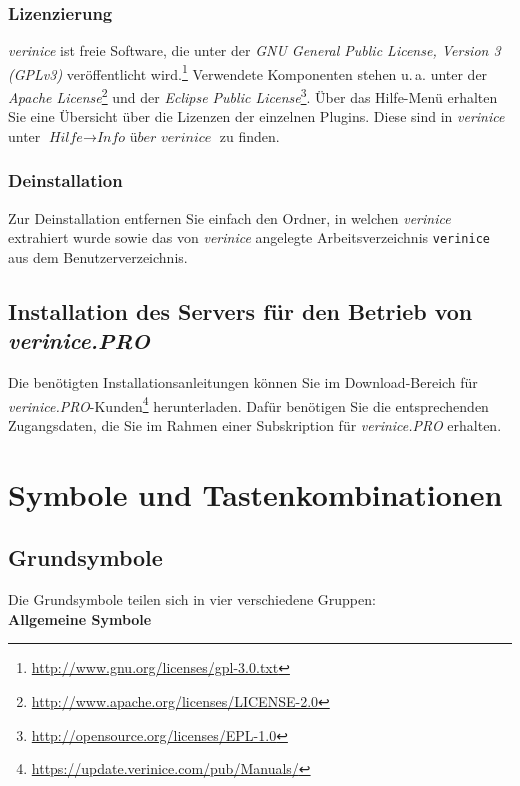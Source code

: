 \documentclass[a4paper,10pt]{book}
\newcommand{\ua}{\mbox{u.\,a.}\xspace}
\begin{document}
\subsection{Lizenzierung}

\textit{verinice} ist freie Software, die unter der \textit{GNU General Public
License, Version 3 (GPLv3)} veröffentlicht
wird.\footnote{\url{http://www.gnu.org/licenses/gpl-3.0.txt}} Verwendete
Komponenten stehen \ua unter der {\em Apache
License}\footnote{\url{http://www.apache.org/licenses/LICENSE-2.0}} und der {\em
Eclipse Public License}\footnote{\url{http://opensource.org/licenses/EPL-1.0}}.
Über das Hilfe-Menü erhalten Sie eine Übersicht über die Lizenzen der einzelnen
Plugins. Diese sind in \textit{verinice} unter $\textit{Hilfe}\to\textit{Info
über verinice}$ zu finden.


\subsection{Deinstallation}

Zur Deinstallation entfernen Sie einfach den Ordner, in welchen
\textit{verinice} extrahiert wurde sowie das von \textit{verinice} angelegte
Arbeitsverzeichnis \texttt{verinice} aus dem Benutzerverzeichnis.


\section{Installation des Servers für den Betrieb von \textit{verinice.PRO}}

Die benötigten Installationsanleitungen können Sie im Download-Bereich für
\textit{verinice.PRO}-Kunden\footnote{\url{https://update.verinice.com/pub/Manuals/}}
herunterladen. Dafür benötigen Sie die entsprechenden Zugangsdaten, die Sie im
Rahmen einer Subskription für \textit{verinice.PRO} erhalten.


\chapter{Symbole und Tastenkombinationen}

\section{Grundsymbole}
Die Grundsymbole teilen sich in vier verschiedene Gruppen:
\newline\\
\textbf{Allgemeine Symbole}
\end{document}
